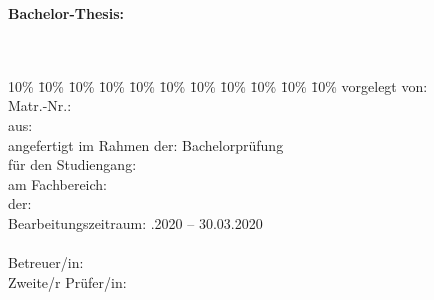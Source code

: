 \begin{titlepage}
  \begin{center}
  \textbf{Bachelor-Thesis:}\\
  \Huge{\textbf{\myTitel}}\\
  \LARGE{\mySubtitel}\\
  \vspace{0.2cm}
  \end{center}
  \normalsize
  \vfill
  \begin{tabbing}
    10\% \= 10\% \= 10\% \= 10\% \= 10\% \= 10\% \= 10\% \= 10\% \= 10\% \= 10\% \= 10\% \kill
    vorgelegt von: \> \> \> \> \> \> \> \> \> \> \myAutor\\
    Matr.-Nr.: \> \> \> \> \> \> \> \> \> \> \myMatrikelNr\\
    aus: \> \> \> \> \> \> \> \> \> \> \myLocation\\
    angefertigt im Rahmen der: \> \> \> \> \> \> \> \> \> \>  Bachelorprüfung\\%
    für den Studiengang: \> \> \> \> \> \> \> \> \> \> \myStudiengang \\
    am Fachbereich: \> \> \> \> \> \> \> \> \> \> \myFachbereich\\
    der:  \> \> \> \> \> \> \> \> \> \> \myHochschulName \\
    Bearbeitungszeitraum: \> \> \> \> \> \> \> \> \> .2020 -- 30.03.2020 \\
    \\
    Betreuer/in: \> \> \> \> \> \> \> \> \> \> \myBetreuer\\
    Zweite/r Prüfer/in: \> \> \> \> \> \> \> \> \> \> \myZweitpruefer\\
  \end{tabbing}
\end{titlepage}
